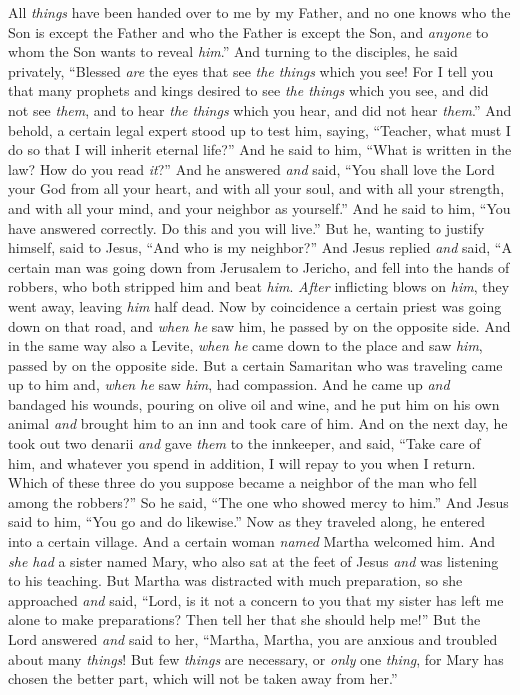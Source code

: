\begin{biblechapter}
\verse All \textit{things} have been handed over to me by my Father, and no one knows who the Son is except the Father and who the Father is except the Son, and \textit{anyone} to whom the Son wants to reveal \textit{him}.”
\verse And turning to the disciples, he said privately, “Blessed \textit{are} the eyes that see \textit{the things} which you see!
\verse For I tell you that many prophets and kings desired to see \textit{the things} which you see, and did not see \textit{them}, and to hear \textit{the things} which you hear, and did not hear \textit{them}.”
 And behold, a certain legal expert stood up to test him, saying, “Teacher, what must I do so that I will inherit eternal life?”
\verse And he said to him, “What is written in the law? How do you read \textit{it}?”
\verse And he answered \textit{and} said, “You shall love the Lord your God from all your heart, and with all your soul, and with all your strength, and with all your mind, and your neighbor as yourself.”
\verse And he said to him, “You have answered correctly. Do this and you will live.”
\verse But he, wanting to justify himself, said to Jesus, “And who is my neighbor?”
\verse And Jesus replied \textit{and} said, “A certain man was going down from Jerusalem to Jericho, and fell into the hands of robbers, who both stripped him and beat \textit{him}. \textit{After} inflicting blows on \textit{him}, they went away, leaving \textit{him} half dead.
\verse Now by coincidence a certain priest was going down on that road, and \textit{when he} saw him, he passed by on the opposite side.
\verse And in the same way also a Levite, \textit{when he} came down to the place and saw \textit{him}, passed by on the opposite side.
\verse But a certain Samaritan who was traveling came up to him and, \textit{when he} saw \textit{him}, had compassion.
\verse And he came up \textit{and} bandaged his wounds, pouring on olive oil and wine, and he put him on his own animal \textit{and} brought him to an inn and took care of him.
\verse And on the next day, he took out two denarii \textit{and} gave \textit{them}﻿ to the innkeeper, and said, “Take care of him, and whatever you spend in addition, I will repay to you when I return.
\verse Which of these three do you suppose became a neighbor of the man who fell among the robbers?”
\verse So he said, “The one who showed mercy to him.” And Jesus said to him, “You go and do likewise.”
 Now as they traveled along, he entered into a certain village. And a certain woman \textit{named} Martha welcomed him.
\verse And \textit{she had} a sister named Mary, who also sat at the feet of Jesus \textit{and} was listening to his teaching.
\verse But Martha was distracted with much preparation, so she approached \textit{and} said, “Lord, is it not a concern to you that my sister has left me alone to make preparations? Then tell her that she should help me!”
\verse But the Lord answered \textit{and} said to her, “Martha, Martha, you are anxious and troubled about many \textit{things}!
\verse But few \textit{things} are necessary, or \textit{only} one \textit{thing}, for Mary has chosen the better part, which will not be taken away from her.”
\end{biblechapter}

